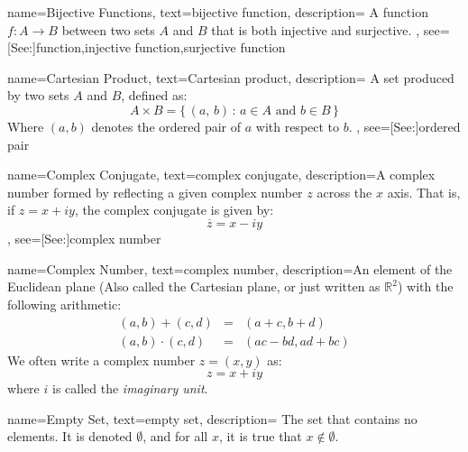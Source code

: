 {
    name={Bijective Functions},
    text={bijective function},
    description={
        A function $f:A\rightarrow{B}$ between two sets $A$ and $B$ that
        is both injective and surjective.
    },
    see=[See:]{function,injective function,surjective function}
}

{
    name={Cartesian Product},
    text={Cartesian product},
    description={
        A set produced by two sets $A$ and $B$, defined as:
        \begin{equation*}
            A\times{B}=\{\,(a,\,b)\,:\,a\in{A}\textrm{ and }b\in{B}\,\}
        \end{equation*}
        Where $(a,b)$ denotes the ordered pair of $a$ with respect to $b$.
    },
    see=[See:]{ordered pair}
}

{
    name={Complex Conjugate},
    text={complex conjugate},
    description={A complex number formed by reflecting a
                 given complex number $z$ across the $x$
                 axis. That is, if $z=x+iy$, the complex
                 conjugate is given by:
                 \begin{equation*}
                     \overline{z}=x-iy
                 \end{equation*}
                },
    see=[See:]{complex number}
}

{
    name={Complex Number},
    text={complex number},
    description={An element of the Euclidean plane (Also called the
                 Cartesian plane, or just written as $\mathbb{R}^{2}$)
                 with the following arithmetic:
                 \begin{eqnarray*}
                     (a,b)+(c,d)
                     \!&\!=\!&\!(a+c,b+d)\\
                     (a,b)\cdot(c,d)
                     \!&\!=\!&\!(ac-bd,ad+bc)
                 \end{eqnarray*}
                 We often write a complex number $z=(x,y)$ as:
                 \begin{equation*}
                     z=x+iy
                 \end{equation*}
                 where $i$ is called the \textit{imaginary unit}.
                }
}

{
    name={Empty Set},
    text={empty set},
    description={
        The set that contains no elements. It is denoted $\emptyset$, and for
        all $x$, it is true that $x\notin\emptyset$.
    }
}


